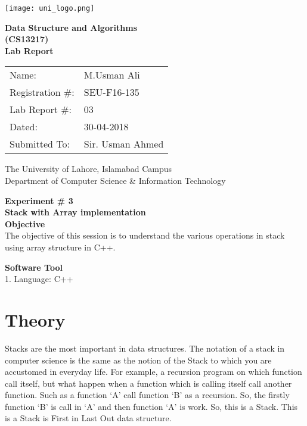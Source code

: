 \documentclass[11pt]{article}            %
\begin{document}
\begin{titlepage}
    \centering
  \vfill
    \texttt{[image: uni\_logo.png]} \\ 
	\vskip2cm
    {\bfseries\Large
	Data Structure and Algorithms \\ (CS13217)\\
	
	\vskip2cm
	Lab Report 
	 
	\vskip2cm
	}    

\begin{center}
\begin{tabular}{ l l  } 

Name: & M.Usman Ali \\ 
Registration \#: & SEU-F16-135 \\ 
Lab Report \#: & 03 \\ 
 Dated:& 30-04-2018\\ 
Submitted To:& Sir. Usman Ahmed\\ 

\end{tabular}
\end{center}
    \vfill
    The University of Lahore, Islamabad Campus\\
Department of Computer Science \& Information Technology
\end{titlepage}


    
    {\bfseries\Large
\centering
	Experiment \# 3 \\

Stack with Array implementation \\
	
	}    
 \vskip1cm
 \textbf {Objective}\\ The objective of this session is to understand the various operations in stack using array structure in C++. 
 
 \textbf {Software Tool} \\
1. Language: C++\\

\section{Theory }              
Stacks are the most important in data structures. The notation of a stack in computer science is
the same as the notion of the Stack to which you are accustomed in everyday life. For example, a
recursion program on which function call itself, but what happen when a function which is
calling itself call another function. Such as a function ‘A’ call function ‘B’ as a recursion. So, the
firstly function ‘B’ is call in ‘A’ and then function ‘A’ is work. So, this is a Stack. This is a
Stack is First in Last Out data structure.
\end{document}
